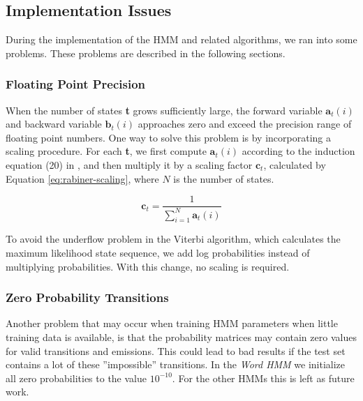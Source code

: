 \subsection{Implementation Issues}

During the implementation of the HMM and related algorithms, we ran into some problems. These problems are described in the following sections.

\subsubsection{Floating Point Precision}

When the number of states \textbf{t} grows sufficiently large, the forward variable $\textbf{a}_t(i)$ and backward variable  $\textbf{b}_t(i)$ approaches zero and exceed the precision range of floating point numbers.
One way to solve this problem is by incorporating a scaling procedure.
For each \textbf{t}, we first compute $\textbf{a}_t(i)$ according to the induction equation (20) in  \cite{Rabiner1989}, and then multiply it by a scaling factor  $\textbf{c}_t$, calculated by Equation \ref{eq:rabiner-scaling}, where $N$ is the number of states.

\begin{equation}\label{eq:rabiner-scaling}
\textbf{c}_t = \frac{1}{ \displaystyle\sum_{i=1}^N \textbf{a}_t(i)}
\end{equation}

To avoid the underflow problem in the Viterbi algorithm, which calculates the maximum likelihood state sequence, we add log probabilities instead of multiplying probabilities.
With this change, no scaling is required.

\subsubsection{Zero Probability Transitions}
Another problem that may occur when training HMM parameters when little training data is available, is that the probability matrices may contain zero values for valid transitions and emissions.
This could lead to bad results if the test set contains a lot of these ''impossible'' transitions.
In the \textit{Word HMM} we initialize all zero probabilities to the value \textbf{ $10^{-10}$}.
For the other HMMs this is left as future work.